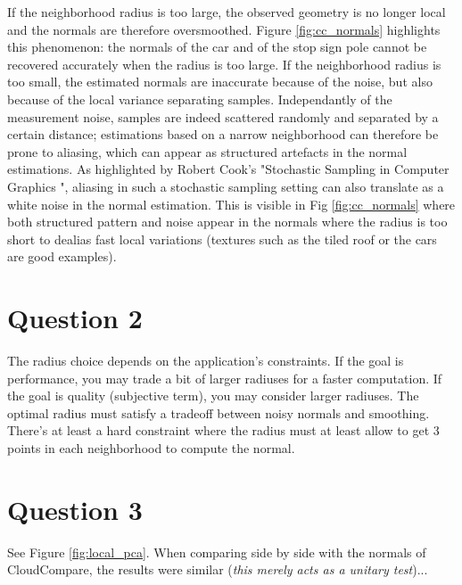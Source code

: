 \documentclass[a4paper]{article}
\begin{document}
If the neighborhood radius is too large, the observed geometry is no longer local and the normals are therefore oversmoothed.
Figure \ref{fig:cc_normals} highlights this phenomenon: the normals of the car and of the stop sign pole cannot be recovered accurately when the radius is too large.
If the neighborhood radius is too small, the estimated normals are inaccurate because of the noise, but also because of the local variance separating samples.
Independantly of the measurement noise, samples are indeed scattered randomly and separated by a certain distance; estimations based on a narrow neighborhood can therefore
be prone to aliasing, which can appear as structured artefacts in the normal estimations. As highlighted by Robert Cook's "Stochastic Sampling in Computer Graphics 
", aliasing in such a stochastic sampling setting can also translate as a white noise in the normal estimation. This is visible in Fig \ref{fig:cc_normals} where both structured pattern
and noise appear in the normals where the radius is too short to dealias fast local variations (textures such as the tiled roof or the cars are good examples).



\section*{Question 2}
The radius choice depends on the application's constraints. If the goal is performance, you may trade a bit of larger radiuses for a faster computation. If the goal is quality (subjective term), you may consider larger radiuses. The optimal radius must satisfy a tradeoff between noisy normals and smoothing. There's at least a hard constraint where the radius must at least allow to get 3 points in each neighborhood to compute the normal. 

\pagebreak

\section*{Question 3}
See  Figure \ref{fig:local_pca}. When comparing side by side with the normals of CloudCompare, the results were similar (\textit{this merely acts as a unitary test})...
\end{document}
